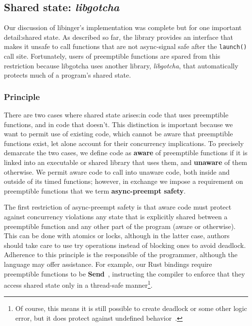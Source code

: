 \subsection{Shared state: \textit{libgotcha}}
\label{sec:libgotcha}

Our discussion of libinger's implementation was complete but for one important
detail:\@ shared state.  As described so far, the library provides an interface that
makes it unsafe to call functions that are not async-signal safe after the
\texttt{launch()} call site.  Fortunately, users of preemptible functions are spared
from this
restriction because libgotcha uses another library, \textit{libgotcha}, that
automatically protects much of a program's shared state.

\subsubsection{Principle}

There are two cases where shared state arises:\@ in code that uses preemptible
functions, and in code that doesn't.  This distinction is important because we want
to permit use of existing code, which cannot be aware that preemptible functions
exist, let alone account for their concurrency implications.  To precisely demarcate
the two cases, we define code as \textbf{aware} of preemptible functions if it is
linked into an executable or shared library that uses them, and \textbf{unaware} of
them otherwise.  We permit aware code to call into unaware code, both inside and
outside of its timed functions; however, in exchange we impose a requirement on
preemptible functions that we term \textbf{async-preempt safety}.

The first restriction of async-preempt safety is that aware code must protect against
concurrency violations any state that is explicitly shared between a preemptible
function and any other part of the program (aware or otherwise).  This can be done
with atomics or locks, although in the latter case, authors should take care to use
try operations instead of blocking ones to avoid deadlock.  Adherence to this
principle is the responsible of the programmer, although the language may offer
assistance.  For example, our Rust bindings require preemptible functions to be
\textbf{Send}~\cite{www-rustlang-conc}, instructing the compiler to enforce that they
access shared state only in a thread-safe manner\footnote{Of course, this means it is
still possible to create deadlock or some other logic error, but it does protect
against undefined behavior~\cite{www-rustlang-nu}.}.

